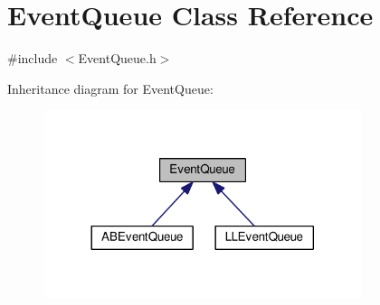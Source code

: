\hypertarget{class_event_queue}{}\section{Event\+Queue Class Reference}
\label{class_event_queue}


{\ttfamily \#include $<$Event\+Queue.\+h$>$}



Inheritance diagram for Event\+Queue\+:
\nopagebreak
\begin{figure}[H]
\begin{center}
\leavevmode
\includegraphics[width=264pt]{class_event_queue__inherit__graph}
\end{center}
\end{figure}
